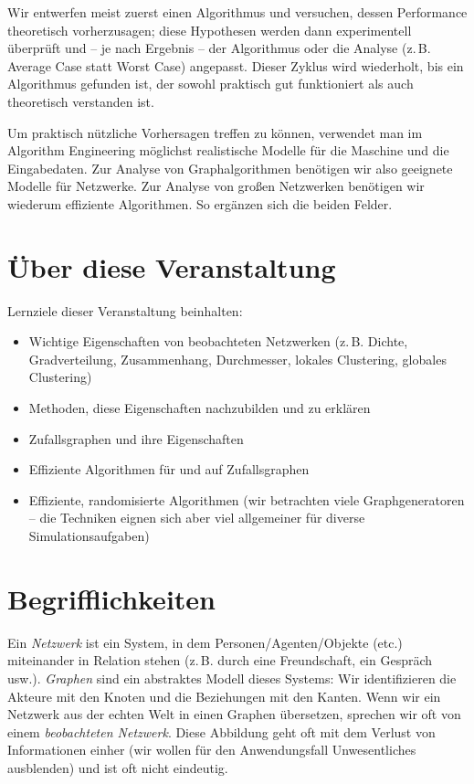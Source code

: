 Wir entwerfen meist zuerst einen Algorithmus und versuchen, dessen Performance theoretisch vorherzusagen;
diese Hypothesen werden dann experimentell überprüft und -- je nach Ergebnis -- der Algorithmus oder die Analyse (z.\,B. Average Case statt Worst Case) angepasst.
Dieser Zyklus wird wiederholt, bis ein Algorithmus gefunden ist, der sowohl praktisch gut funktioniert als auch theoretisch verstanden ist.

Um praktisch nützliche Vorhersagen treffen zu können, verwendet man im Algorithm Engineering möglichst realistische Modelle für die Maschine und die Eingabedaten.
Zur Analyse von Graphalgorithmen benötigen wir also geeignete Modelle für Netzwerke.
Zur Analyse von großen Netzwerken benötigen wir wiederum effiziente Algorithmen.
So ergänzen sich die beiden Felder.

\section{Über diese Veranstaltung}
Lernziele dieser Veranstaltung beinhalten:
\begin{itemize}
    \item Wichtige Eigenschaften von beobachteten Netzwerken (z.\,B. Dichte, Gradverteilung, Zusammenhang, Durchmesser, lokales Clustering, globales Clustering)
    \item Methoden, diese Eigenschaften nachzubilden und zu erklären
    \item Zufallsgraphen und ihre Eigenschaften
    \item Effiziente Algorithmen für und auf Zufallsgraphen
    \item Effiziente, randomisierte Algorithmen (wir betrachten viele Graphgeneratoren -- die Techniken eignen sich aber viel allgemeiner für diverse Simulationsaufgaben)
\end{itemize}

\section{Begrifflichkeiten}
Ein \emph{Netzwerk} ist ein System, in dem Personen/Agenten/Objekte (etc.) miteinander in Relation stehen (z.\,B. durch eine Freundschaft, ein Gespräch usw.).
\emph{Graphen} sind ein abstraktes Modell dieses Systems: Wir identifizieren die Akteure mit den Knoten und die Beziehungen mit den Kanten.
Wenn wir ein Netzwerk aus der echten Welt in einen Graphen übersetzen, sprechen wir oft von einem \emph{beobachteten Netzwerk}.
Diese Abbildung geht oft mit dem Verlust von Informationen einher (wir wollen für den Anwendungsfall Unwesentliches ausblenden) und ist oft nicht eindeutig.

